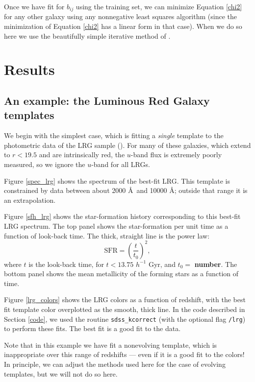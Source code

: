 \documentclass[10pt,preprint]{aastex}
\begin{document}
Once we have fit for $b_{ij}$ using the training set, we can minimize
Equation \ref{chi2} for any other galaxy using any nonnegative least
squares algorithm (since the minimization of Equation \ref{chi2} has a
linear form in that case).  When we do so here we use the beautifully
simple iterative method of \citet{sha02a}.

\section{Results}
\label{results}

\subsection{An example: the Luminous Red Galaxy templates}

We begin with the simplest case, which is fitting a {\it single}
template to the photometric data of the LRG sample
(\citealt{eisenstein01a}). For many of these galaxies, which extend to
$r<19.5$ and are intrinsically red, the $u$-band flux is extremely
poorly measured, so we ignore the $u$-band for all LRGs. 

Figure \ref{spec_lrg} shows the spectrum of the best-fit LRG.  This
template is constrained by data between about 2000 \AA\ and 10000 \AA;
outside that range it is an extrapolation.

Figure \ref{sfh_lrg} shows the star-formation history corresponding to
this best-fit LRG spectrum. The top panel shows the star-formation per
unit time as a function of look-back time.  The thick, straight line
is the power law:
\begin{equation}
\mathrm{SFR} = \left(\frac{t}{t_0}\right)^2,
\end{equation}
where $t$ is the look-back time, for $t<13.75$ $h^{-1}$ Gyr, and $t_0=$
{\bf number}. The bottom panel shows the mean metallicity of the
forming stars as a function of time.

Figure \ref{lrg_colors} shows the LRG colors as a function of
redshift, with the best fit template color overplotted as the smooth,
thick line. In the code described in Section \ref{code}, we used the
routine {\tt sdss\_kcorrect} (with the optional flag {\tt /lrg}) to
perform these fits. The best fit is a good fit to the data.

Note that in this example we have fit a nonevolving template, which is
inappropriate over this range of redshifts --- even if it is a good
fit to the colors! In principle, we can adjust the methods used here
for the case of evolving templates, but we will not do so here.
\end{document}
